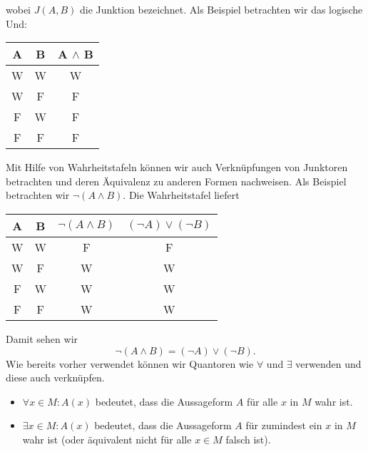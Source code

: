 wobei \(J(A,B)\) die Junktion bezeichnet. Als Beispiel betrachten wir das logische Und:


\begin{center}
\centering
\begin{tabularx}{\linewidth}[]{|c|c|c|}\hline
 
A
& 
B
& 
A \(\land\) B
\\
\hline
W
&
W
&
W
\\
\hline
W
&
F
&
F
\\
\hline
F
&
W
&
F
\\
\hline
F
&
F
&
F
\\
\hline
\end{tabularx}
\end{center}

Mit Hilfe von Wahrheitstafeln können wir auch Verknüpfungen von Junktoren betrachten und deren Äquivalenz zu anderen Formen nachweisen. Als Beispiel betrachten wir \(\lnot (A \land B)\).
Die Wahrheitstafel liefert


\begin{center}
\centering
\begin{tabularx}{\linewidth}[{\linewidth}]{|c|c|c|c|}\hline
 
A
& 
B
& 
\(\lnot (A \land B)\)
& 
\((\lnot A) \lor (\lnot B)\)
\\
\hline
W
&
W
&
F
&
F
\\
\hline
W
&
F
&
W
&
W
\\
\hline
F
&
W
&
W
&
W
\\
\hline
F
&
F
&
W
&
W
\\
\hline
\end{tabularx}
\end{center}

Damit sehen wir
\begin{equation*}
\lnot (A \land B) = (\lnot A) \lor (\lnot B).
\end{equation*}
Wie bereits vorher verwendet können wir Quantoren wie \(\forall\) und \(\exists\) verwenden und diese auch verknüpfen.
\begin{itemize}
\item {} 
\(\forall x \in M: A(x) \) bedeutet, dass die Aussageform \(A\) für alle \(x\) in \(M\) wahr ist.

\item {} 
\(\exists x \in M: A(x) \) bedeutet, dass die Aussageform \(A\) für zumindest ein \(x\) in \(M\) wahr ist (oder äquivalent nicht für alle \(x \in M\) falsch ist).

\end{itemize}

